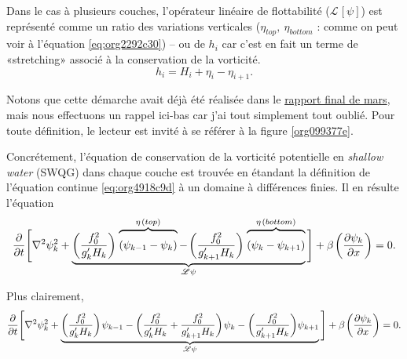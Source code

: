\documentclass[10pt]{article}
\numberwithin{equation}{section}
\newcommand{\grande}{\vphantom{\frac{1}{xx}}}
\newcommand{\pt}{\hspace{1pt}} %
\begin{document}
Dans le cas à plusieurs couches, l'opérateur linéaire de flottabilité (\(\mathscr{L}\pt[\psi]\)) est représenté comme un ratio des variations verticales (\(\eta_{top},\ \eta_{bottom}\) : comme on peut voir à l'équation \ref{eq:org2292c30}) -- ou de \(h_i\) car c'est en fait un terme de «stretching» associé à la conservation de la vorticité.
\begin{equation}
   h_i = H_i + \eta_i - \eta_{i+1}.
\end{equation}

Notons que cette démarche avait déjà été réalisée dans le \href{rapport-2023-03-31.pdf}{rapport final de mars}, mais nous effectuons un rappel ici-bas car j'ai tout simplement tout oublié.
Pour toute définition, le lecteur est invité à se référer à la figure \ref{org099377e}. \bigskip

Concrétement, l'équation de conservation de la vorticité potentielle en \emph{shallow water} (SWQG) dans chaque couche \autocite[p.186]{vallis_2006} est trouvée en étandant la définition de l'équation continue \ref{eq:org4918c9d} à un domaine à différences finies.
Il en résulte l'équation
\begin{equation}
\label{eq:org2292c30}
   \pdv{}{t} \Bigg[ \laplacian{\psi^2_k} + \underbrace{\qty(\frac{f_0^2}{g_k' H_k})\pt \overbrace{\qty(\psi_{k-1}-\psi_k)\grande}^{\eta\pt(top)} -\pt \qty(\frac{f_0^2}{g_{k+1}' H_k})\pt \overbrace{\qty(\psi_{k} - \psi_{k+1})\grande}^{\eta\pt(bottom)}}_{\mathscr{L \psi}} \Bigg] + \beta\pt \qty(\pdv{\psi_k}{x}) = 0.
\end{equation}

Plus clairement,
\begin{equation}
   \pdv{}{t} \Bigg[ \laplacian{\psi^2_k} + \underbrace{\qty(\frac{f_0^2}{g_k' H_k})\pt \psi_{k-1} - \qty(\frac{f_0^2}{g_k' H_k} + \frac{f_0^2}{g_{k+1}' H_k}) \pt \psi_{k} - \qty(\frac{f_0^2}{g_{k+1}' H_k})\psi_{k+1}}_\mathscr{L\psi} \Bigg] + \beta\pt \qty(\pdv{\psi_k}{x}) = 0.
\end{equation}
\end{document}
